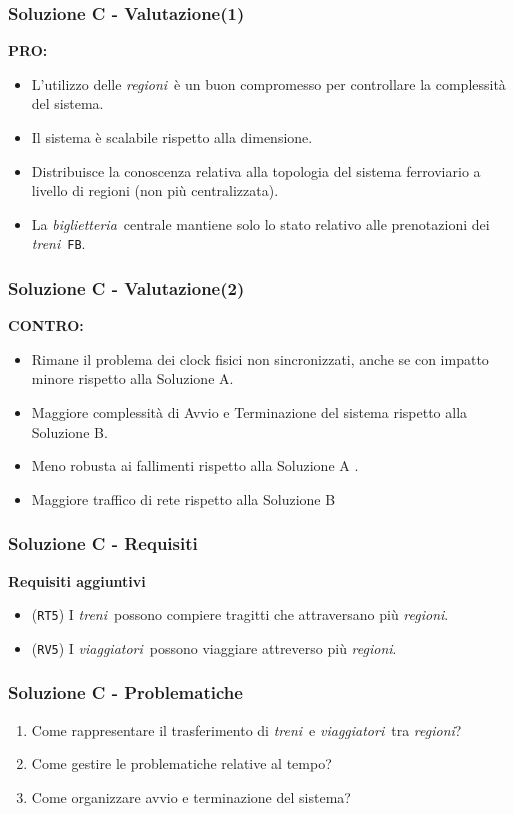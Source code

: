 \documentclass[slidestop,compress,blackandwhite]{beamer}
\newcommand{\ttt}[1]{\texttt{#1}}
\newcommand{\ii}[1]{\textit{#1}}
\newcommand{\treni}{\ii{treni}}
\newcommand{\viaggiatori}{\ii{viaggiatori}}
\newcommand{\biglietteria}{\ii{biglietteria}}
\newcommand{\regioni}{\ii{regioni}}
\newcommand{\PRO}{\textbf{PRO:}}
\newcommand{\CONTRO}{\textbf{CONTRO:}}
\newcommand{\newframe}[2]{\begin{frame}\frametitle{#1}#2\end{frame}}
\newcommand{\itemt}[1]{\item (\ttt{#1})}
\begin{document}
	\newframe{Soluzione C - Valutazione(1)}{
		\vspace{0.5cm}
		\PRO
		\begin{itemize}
			\item L'utilizzo delle \regioni~è un buon compromesso per controllare la complessità del sistema.
			\item Il sistema è scalabile rispetto alla dimensione.
			\item Distribuisce la conoscenza relativa alla topologia del sistema ferroviario a livello di regioni (non più centralizzata).
			\item La \biglietteria~centrale mantiene solo lo stato relativo alle prenotazioni dei \treni~\ttt{FB}.
		\end{itemize}
	
	}
	
	\newframe{Soluzione C - Valutazione(2)}{
		\vspace{0.5cm}
		\CONTRO
		\begin{itemize}
			\item Rimane il problema dei clock fisici non sincronizzati, anche se con impatto minore rispetto alla Soluzione A.
			\item Maggiore complessità di Avvio e Terminazione del sistema rispetto alla Soluzione B.
			\item Meno robusta ai fallimenti rispetto alla Soluzione A .
			\item Maggiore traffico di rete rispetto alla Soluzione B
		\end{itemize}
	}
	
	\newframe{Soluzione C - Requisiti}{
		\vspace{0.5cm}
		\textbf{Requisiti aggiuntivi}
		\begin{itemize}
			\itemt{RT5} I \treni~possono compiere tragitti che attraversano più \regioni.
			\itemt{RV5} I \viaggiatori~possono viaggiare attreverso più \regioni.
		\end{itemize}
	}
	
	\newframe{Soluzione C - Problematiche}{
		\vspace{0.5cm}
		\begin{enumerate}
			\item Come rappresentare il trasferimento di \treni~e \viaggiatori~tra \regioni? 
			\vspace{0.4cm}
			\item Come gestire le problematiche relative al tempo?
			\vspace{0.4cm}
			\item Come organizzare avvio e terminazione del sistema?
		\end{enumerate}
	}
	
\end{document}
